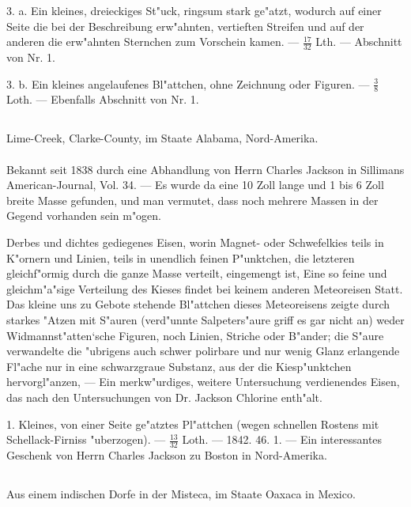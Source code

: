 \documentclass[a4paper, 11pt, oneside, polutonikogreek, german]{article}
\begin{document}
3. a. Ein kleines, dreieckiges St"uck, ringsum stark ge"atzt, wodurch auf einer Seite die bei der Beschreibung erw"ahnten, vertieften Streifen und auf der anderen die erw"ahnten Sternchen zum Vorschein kamen. --- $\mathfrak{\frac{17}{32}}$ Lth. --- Abschnitt von Nr. 1.

3. b. Ein kleines angelaufenes Bl"attchen, ohne Zeichnung oder Figuren. --- $\mathfrak{\frac{3}{8}}$ Loth. --- Ebenfalls Abschnitt von Nr. 1.
\subsection{}
\begin{center}

Lime-Creek, Clarke-County, im Staate Alabama, Nord-Amerika.
\end{center}
\paragraph{}
Bekannt seit 1838 durch eine Abhandlung von Herrn Charles Jackson in Sillimans American-Journal, Vol. 34. --- Es wurde da eine 10 Zoll lange und 1 bis 6 Zoll breite Masse gefunden, und man vermutet, dass noch mehrere Massen in der Gegend vorhanden sein m"ogen.

Derbes und dichtes gediegenes Eisen, worin Magnet- oder Schwefelkies teils in K"ornern und Linien, teils in unendlich feinen P"unktchen, die letzteren gleichf"ormig durch die ganze Masse verteilt, eingemengt ist, Eine so feine und gleichm"a"sige Verteilung des Kieses findet bei keinem anderen Meteoreisen Statt. Das kleine uns zu Gebote stehende Bl"attchen dieses Meteoreisens zeigte durch starkes "Atzen mit S"auren (verd"unnte Salpeters"aure griff es gar nicht an) weder Widmannst"atten‘sche Figuren, noch Linien, Striche oder B"ander; die S"aure verwandelte die "ubrigens auch schwer polirbare und nur wenig Glanz erlangende Fl"ache nur in eine schwarzgraue Substanz, aus der die Kiesp"unktchen hervorgl"anzen, --- Ein merkw"urdiges, weitere Untersuchung verdienendes Eisen, das nach den Untersuchungen von Dr. Jackson Chlorine enth"alt.

1. Kleines, von einer Seite ge"atztes Pl"attchen (wegen schnellen Rostens mit Schellack-Firniss "uberzogen). --- $\mathfrak{\frac{13}{32}}$ Loth. --- 1842. 46. 1. --- Ein interessantes Geschenk von Herrn Charles Jackson zu Boston in Nord-Amerika.
\subsection{}
\begin{center}

Aus einem indischen Dorfe in der Misteca, im Staate Oaxaca in Mexico.
\end{center}
\end{document}
